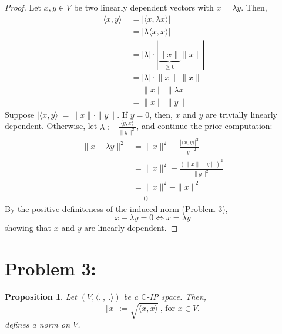\documentclass[12pt, reqno]{amsart}
\newtheorem{prop}{Proposition}[section]
\theoremstyle{definition}
\theoremstyle{remark}
\begin{document}
\begin{proof}
    \vspace*{.2 cm}

    Let $x,y\in V$ be two linearly dependent vectors with $x= \lambda y$. Then, \begin{align*}
    |\langle x,y\rangle|&= |\langle x, \lambda x\rangle|\\
    &= |\lambda\langle x,x\rangle|\\
    &= |\lambda|\cdot|\underbrace{\|x\|}_{\ge0}\|x\||\\
    &= |\lambda|\cdot{\|x\|}\  \|x\|\\\
    &= \|x\|\ \|\lambda x\|\\
    &= \|x\|\ \|y\|
    \end{align*}
    Suppose $|\langle x,y\rangle|=\|x\|\cdot\|y\|$. If $y=0$, then, $x$ and $y$ are trivially linearly dependent. Otherwise, let $\lambda:=\frac{\langle y,x\rangle}{\|y\|^{2}}$, and continue the prior computation: \begin{align*}
    \|x-\lambda y\|^{2}&= \|x\|^{2}- \frac{|\langle x,y\rangle|^{2}}{\|y\|^{2}}\\
    &= \|x\|^{2}- \frac{(\|x\|\|y\|)^{2}}{\|y\|^{2}}\\
    &= \|x\|^{2}- \|x\|^{2}\\
    &= 0
    \end{align*}By the positive definiteness of the induced norm (Problem 3), $$x-\lambda y=0\iff x=\lambda y$$showing that $x$ and $y$ are linearly dependent.
\end{proof}



\vspace{0.2 cm}
\section*{Problem 3:} 

\begin{prop}

Let $(V, \langle . ~,~ .\rangle)$ be a $\mathbb{C}$-IP space. Then, 
\begin{equation} 
\Vert x \Vert := \sqrt{ \langle x , x \rangle} ~\mbox{, for $x \in V$.}
\end{equation}
defines a norm on $V$.

\end{prop}
\end{document}
